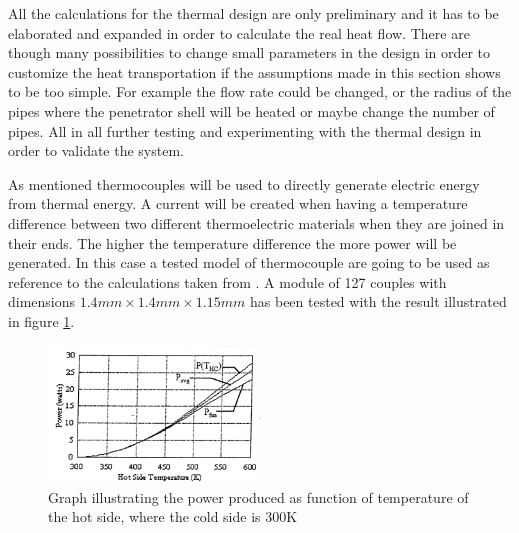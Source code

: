 \noindent
All the calculations for the thermal design are only preliminary and it has to be elaborated and expanded in order to calculate the real heat flow. There are though many possibilities to change small parameters in the design in order to customize the heat transportation if the assumptions made in this section shows to be too simple. For example the flow rate could be changed, or the radius of the pipes where the penetrator shell will be heated or maybe change the number of pipes. All in all further testing and experimenting with the thermal design in order to validate the system. 

 \label{sec:thermocouples}
As mentioned thermocouples will be used to directly generate electric energy from thermal energy. A current will be created when having a temperature difference between two different thermoelectric materials when they are joined in their ends. The higher the temperature difference the more power will be generated. In this case a tested model of thermocouple are going to be used as reference to the calculations taken from \cite{lau1997a}. A module of 127 couples with dimensions $1.4mm\times 1.4mm\times 1.15mm$ has been tested with the result illustrated in figure \ref{fig:thermocouple}.\\

\begin{figure}[htb]
  \begin{center}
  \includegraphics[width=0.5\textwidth]{figures/Ricardo/thermocouples.png}
  \caption{Graph illustrating the power produced as function of temperature of the hot side, where the cold side is 300K}
  \label{fig:thermocouple}
  \end{center}
\end{figure}

